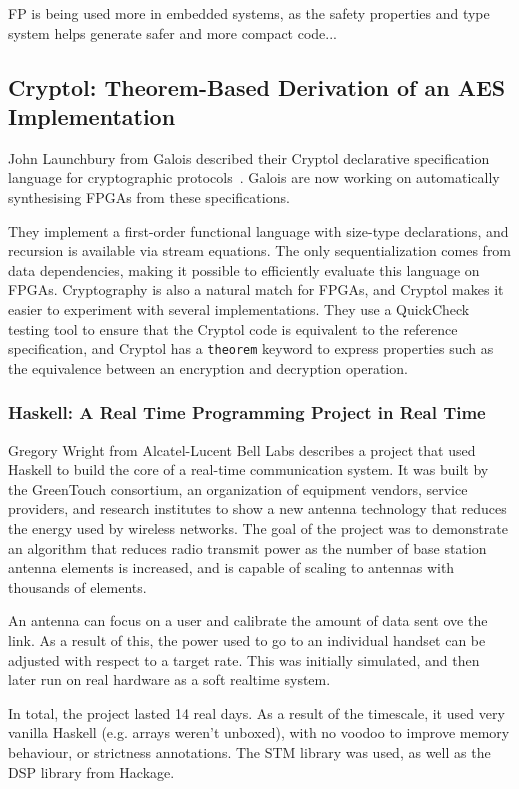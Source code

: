 \documentclass{jfp1}
\begin{document}
FP is being used more in embedded systems, as the safety properties and type system helps generate safer and more compact code...

\subsection{Cryptol: Theorem-Based Derivation of an AES Implementation}

John Launchbury from Galois described their Cryptol declarative specification language
for cryptographic protocols~\cite{xxx}. Galois are now working on automatically
synthesising FPGAs from these specifications.

They implement a first-order functional language with size-type declarations,
and recursion is available via stream equations.  The only sequentialization
comes from data dependencies, making it possible to efficiently evaluate this
language on FPGAs. Cryptography is also a natural match for FPGAs, and Cryptol
makes it easier to experiment with several implementations. They use a
QuickCheck~\cite{x} testing tool to ensure that the Cryptol code is equivalent
to the reference specification, and Cryptol has a {\tt theorem} keyword to
express properties such as the equivalence between an encryption and decryption
operation.

\subsubsection{Haskell: A Real Time Programming Project in Real Time}

Gregory Wright from Alcatel-Lucent Bell Labs describes a project that used Haskell 
to build the core of a real-time communication system.  It was built by
the GreenTouch consortium, an organization of equipment
vendors, service providers, and research institutes to
show a new antenna technology that reduces the energy used
by wireless networks.  The goal of the project was to demonstrate
an algorithm that reduces radio transmit power as the number
of base station antenna elements is increased, and is capable of scaling
to antennas with thousands of elements.

An antenna can focus on a user and calibrate the amount of data sent ove the
link. As a result of this, the power used to go to an individual handset can be
adjusted with respect to a target rate.  This was initially simulated, and then
later run on real hardware as a soft realtime system.

In total, the project lasted 14 real days. As a result of the timescale, it
used very vanilla Haskell (e.g. arrays weren't unboxed), with no voodoo to
improve memory behaviour, or strictness annotations. The STM library was used,
as well as the DSP library from Hackage.
\end{document}

